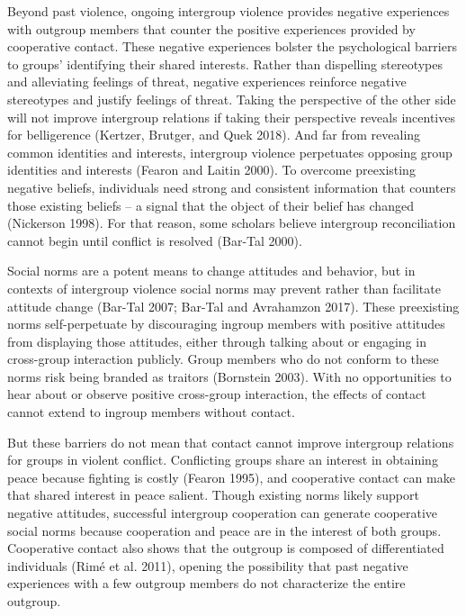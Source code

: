\documentclass[11pt]{article}
\begin{document}
Beyond past violence, ongoing intergroup violence provides negative
experiences with outgroup members that counter the positive experiences
provided by cooperative contact. These negative experiences bolster the
psychological barriers to groups' identifying their shared interests.
Rather than dispelling stereotypes and alleviating feelings of threat,
negative experiences reinforce negative stereotypes and justify feelings
of threat. Taking the perspective of the other side will not improve
intergroup relations if taking their perspective reveals incentives for
belligerence (Kertzer, Brutger, and Quek 2018). And far from revealing
common identities and interests, intergroup violence perpetuates
opposing group identities and interests (Fearon and Laitin 2000). To
overcome preexisting negative beliefs, individuals need strong and
consistent information that counters those existing beliefs -- a signal
that the object of their belief has changed (Nickerson 1998). For that
reason, some scholars believe intergroup reconciliation cannot begin
until conflict is resolved (Bar-Tal 2000).

Social norms are a potent means to change attitudes and behavior, but in
contexts of intergroup violence social norms may prevent rather than
facilitate attitude change (Bar-Tal 2007; Bar-Tal and Avrahamzon 2017).
These preexisting norms self-perpetuate by discouraging ingroup members
with positive attitudes from displaying those attitudes, either through
talking about or engaging in cross-group interaction publicly. Group
members who do not conform to these norms risk being branded as traitors
(Bornstein 2003). With no opportunities to hear about or observe
positive cross-group interaction, the effects of contact cannot extend
to ingroup members without contact.

But these barriers do not mean that contact cannot improve intergroup
relations for groups in violent conflict. Conflicting groups share an
interest in obtaining peace because fighting is costly (Fearon 1995),
and cooperative contact can make that shared interest in peace salient.
Though existing norms likely support negative attitudes, successful
intergroup cooperation can generate cooperative social norms because
cooperation and peace are in the interest of both groups. Cooperative
contact also shows that the outgroup is composed of differentiated
individuals (Rimé et al. 2011), opening the possibility that past
negative experiences with a few outgroup members do not characterize the
entire outgroup.
\end{document}
